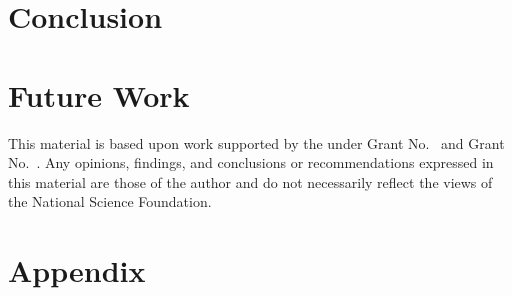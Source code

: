 \documentclass[acmsmall,review,anonymous]{acmart}\settopmatter{printfolios=true,printccs=false,printacmref=false}
\begin{document}
\section{Conclusion}

\section{Future Work}

\begin{acks}                            %
  This material is based upon work supported by the
   under Grant
  No.~ and Grant
  No.~.  Any opinions, findings, and
  conclusions or recommendations expressed in this material are those
  of the author and do not necessarily reflect the views of the
  National Science Foundation.
\end{acks}





\appendix
\section{Appendix}
\end{document}

